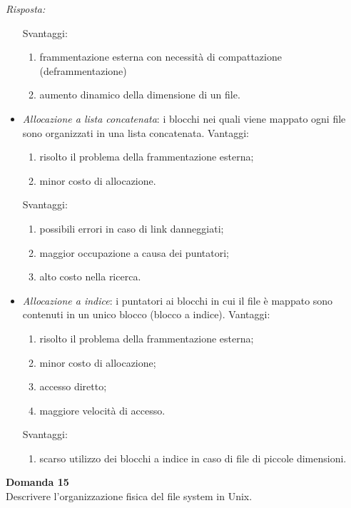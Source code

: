 \documentclass{article}
\newenvironment{problem}[2][Domanda]
    { \begin{mdframed}[backgroundcolor=gray!20] \textbf{#1 #2} \\}
    {  \end{mdframed}}
\newenvironment{solution}
    {\textit{Risposta:}}
    {}
\begin{document}
\begin{solution}
\begin{itemize}
\begin{enumerate}
    \end{enumerate}
    Svantaggi:
    \begin{enumerate}
        \item frammentazione esterna con necessità di compattazione (deframmentazione)
        \item aumento dinamico della dimensione di un file.
    \end{enumerate}
    \item \emph{Allocazione a lista concatenata}: i blocchi nei quali viene mappato ogni file sono organizzati in una lista concatenata.
    \newline
    \newline
  Vantaggi:
  \begin{enumerate}
      \item risolto il problema della frammentazione esterna;
      \item minor costo di allocazione.
  \end{enumerate}
  Svantaggi:
  \begin{enumerate}
      \item possibili errori in caso di link danneggiati;
      \item maggior occupazione a causa dei puntatori;
      \item alto costo nella ricerca.
  \end{enumerate}
  \item \emph{Allocazione a indice}: i puntatori ai blocchi in cui il file è mappato sono contenuti in un unico blocco (blocco a indice).
  \newline
  \newline
  Vantaggi:
  \begin{enumerate}
      \item risolto il problema della frammentazione esterna;
      \item minor costo di allocazione;
      \item accesso diretto;
      \item maggiore velocità di accesso.
  \end{enumerate}
  Svantaggi:
  \begin{enumerate}
      \item scarso utilizzo dei blocchi a indice in caso di file di piccole dimensioni.
  \end{enumerate}
\end{itemize} 
\end{solution}
\begin{problem}{15}
Descrivere l'organizzazione fisica del file system in Unix.
\end{problem}
\end{document}

